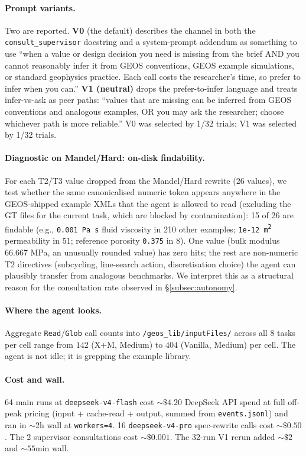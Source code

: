 \documentclass{article}
\begin{document}
\paragraph{Prompt variants.} Two are reported. \textbf{V0} (the default) describes the channel in both the \texttt{consult\_supervisor} docstring and a system-prompt addendum as something to use ``when a value or design decision you need is missing from the brief AND you cannot reasonably infer it from GEOS conventions, GEOS example simulations, or standard geophysics practice. Each call costs the researcher's time, so prefer to infer when you can.'' \textbf{V1 (neutral)} drops the prefer-to-infer language and treats infer-vs-ask as peer paths: ``values that are missing can be inferred from GEOS conventions and analogous examples, OR you may ask the researcher; choose whichever path is more reliable.'' V0 was selected by 1/32 trials; V1 was selected by 1/32 trials.

\paragraph{Diagnostic on Mandel/Hard: on-disk findability.} For each T2/T3 value dropped from the Mandel/Hard rewrite (26 values), we test whether the same canonicalised numeric token appears anywhere in the GEOS-shipped example XMLs that the agent is allowed to read (excluding the GT files for the current task, which are blocked by contamination): 15 of 26 are findable (e.g., \texttt{0.001 Pa\,s} fluid viscosity in 210 other examples; \texttt{1e-12 m\textsuperscript{2}} permeability in 51; reference porosity \texttt{0.375} in 8). One value (bulk modulus 66.667 MPa, an unusually rounded value) has zero hits; the rest are non-numeric T2 directives (subcycling, line-search action, discretisation choice) the agent can plausibly transfer from analogous benchmarks. We interpret this as a structural reason for the consultation rate observed in \S\ref{subsec:autonomy}.

\paragraph{Where the agent looks.} Aggregate \texttt{Read}/\texttt{Glob} call counts into \texttt{/geos\_lib/inputFiles/} across all 8 tasks per cell range from $142$ (X+M, Medium) to $404$ (Vanilla, Medium) per cell. The agent is not idle; it is grepping the example library.

\paragraph{Cost and wall.} 64 main runs at \texttt{deepseek-v4-flash} cost ${\sim}\$4.20$ DeepSeek API spend at full off-peak pricing (input + cache-read + output, summed from \texttt{events.jsonl}) and ran in $\sim$2h wall at \texttt{workers=4}. 16 \texttt{deepseek-v4-pro} spec-rewrite calls cost ${\sim}\$0.50$. The 2 supervisor consultations cost ${\sim}\$0.001$. The 32-run V1 rerun added ${\sim}\$2$ and ${\sim}55$min wall.
\end{document}
